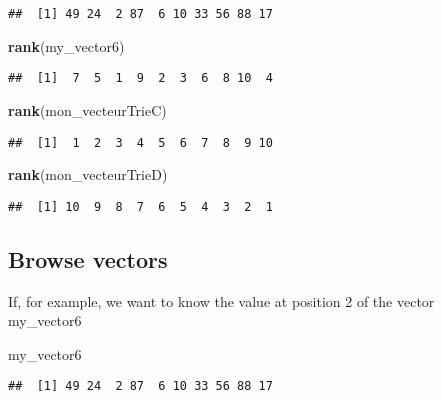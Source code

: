 \documentclass[
]{article}
\newenvironment{Shaded}{\begin{snugshade}}{\end{snugshade}}
\newcommand{\FunctionTok}[1]{\textcolor[rgb]{0.13,0.29,0.53}{\textbf{#1}}}
\newcommand{\NormalTok}[1]{#1}
\begin{document}
\begin{verbatim}
##  [1] 49 24  2 87  6 10 33 56 88 17
\end{verbatim}

\begin{Shaded}
\begin{Highlighting}[]
\FunctionTok{rank}\NormalTok{(my\_vector6) }
\end{Highlighting}
\end{Shaded}

\begin{verbatim}
##  [1]  7  5  1  9  2  3  6  8 10  4
\end{verbatim}

\begin{Shaded}
\begin{Highlighting}[]
\FunctionTok{rank}\NormalTok{(mon\_vecteurTrieC)}
\end{Highlighting}
\end{Shaded}

\begin{verbatim}
##  [1]  1  2  3  4  5  6  7  8  9 10
\end{verbatim}

\begin{Shaded}
\begin{Highlighting}[]
\FunctionTok{rank}\NormalTok{(mon\_vecteurTrieD)}
\end{Highlighting}
\end{Shaded}

\begin{verbatim}
##  [1] 10  9  8  7  6  5  4  3  2  1
\end{verbatim}

\hypertarget{browse-vectors}{%
\subsection{Browse vectors}\label{browse-vectors}}

If, for example, we want to know the value at position 2 of the vector
my\_vector6

\begin{Shaded}
\begin{Highlighting}[]
\NormalTok{my\_vector6}
\end{Highlighting}
\end{Shaded}

\begin{verbatim}
##  [1] 49 24  2 87  6 10 33 56 88 17
\end{verbatim}
\end{document}
